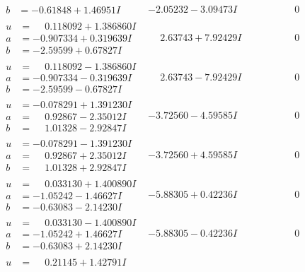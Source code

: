 \documentclass[1p]{elsarticle_modified}
\theoremstyle{definition}
\begin{document}
$$\begin{array}{c|c|c}
\begin{aligned}
b &= -0.61848 + 1.46951 I\end{aligned}
 & -2.05232 - 3.09473 I & \phantom{-0.000000 } 0 \\ \hline\begin{aligned}
u &= \phantom{-}0.118092 + 1.386860 I \\
a &= -0.907334 + 0.319639 I \\
b &= -2.59599 + 0.67827 I\end{aligned}
 & \phantom{-}2.63743 + 7.92429 I & \phantom{-0.000000 } 0 \\ \hline\begin{aligned}
u &= \phantom{-}0.118092 - 1.386860 I \\
a &= -0.907334 - 0.319639 I \\
b &= -2.59599 - 0.67827 I\end{aligned}
 & \phantom{-}2.63743 - 7.92429 I & \phantom{-0.000000 } 0 \\ \hline\begin{aligned}
u &= -0.078291 + 1.391230 I \\
a &= \phantom{-}0.92867 - 2.35012 I \\
b &= \phantom{-}1.01328 - 2.92847 I\end{aligned}
 & -3.72560 - 4.59585 I & \phantom{-0.000000 } 0 \\ \hline\begin{aligned}
u &= -0.078291 - 1.391230 I \\
a &= \phantom{-}0.92867 + 2.35012 I \\
b &= \phantom{-}1.01328 + 2.92847 I\end{aligned}
 & -3.72560 + 4.59585 I & \phantom{-0.000000 } 0 \\ \hline\begin{aligned}
u &= \phantom{-}0.033130 + 1.400890 I \\
a &= -1.05242 - 1.46627 I \\
b &= -0.63083 - 2.14230 I\end{aligned}
 & -5.88305 + 0.42236 I & \phantom{-0.000000 } 0 \\ \hline\begin{aligned}
u &= \phantom{-}0.033130 - 1.400890 I \\
a &= -1.05242 + 1.46627 I \\
b &= -0.63083 + 2.14230 I\end{aligned}
 & -5.88305 - 0.42236 I & \phantom{-0.000000 } 0 \\ \hline\begin{aligned}
u &= \phantom{-}0.21145 + 1.42791 I \\

\end{aligned}
\end{array}$$
\end{document}
